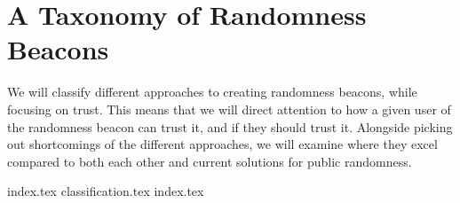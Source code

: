 \section{A Taxonomy of Randomness Beacons}
\label{sec:a_taxonomy_of_randomness_beacons}
We will classify different approaches to creating randomness beacons, while focusing on trust.
This means that we will direct attention to how a given user of the randomness beacon can trust it, and if they should trust it.
Alongside picking out shortcomings of the different approaches, we will examine where they excel compared to both each other and current solutions for public randomness.

{index.tex}
{classification.tex}
{index.tex}
